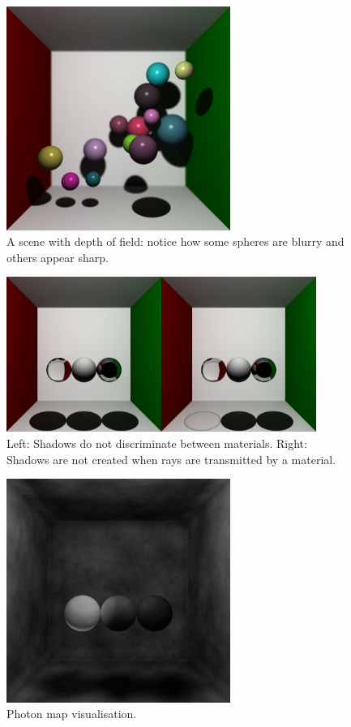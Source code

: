 \documentclass[a4paper]{article}
\begin{document}
\begin{figure}[h]
    \centering
    \includegraphics[width = 0.65\textwidth]{images/depthoffield.png}
    \caption{A scene with depth of field: notice how some spheres are blurry and others appear sharp.}\label{fig:depthoffield}
\end{figure}

\begin{figure}[h]
    \centering
    \includegraphics[width = 0.9\textwidth]{images/glassshadow.png}
    \caption{Left: Shadows do not discriminate between materials. Right: Shadows are not created when rays are transmitted by a material.}\label{fig:glassshadow}
\end{figure}

\begin{figure}[h]
    \centering
    \includegraphics[width = 0.65\textwidth]{images/photonmap.png}
    \caption{Photon map visualisation.}\label{fig:pmap}
\end{figure}
\end{document}
